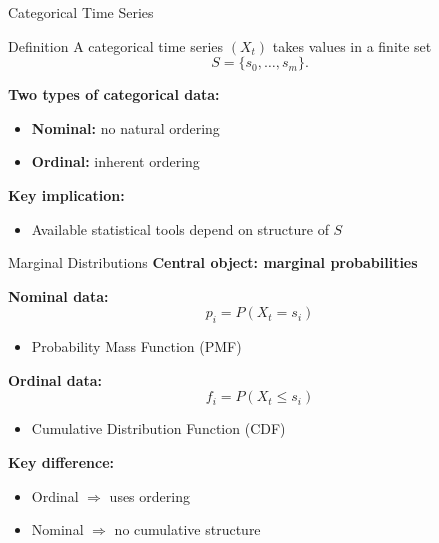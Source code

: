 \documentclass{beamer}
\begin{document}
\begin{frame}{Categorical Time Series}
\begin{block}{Definition}
A categorical time series $(X_t)$ takes values in a finite set
\[
S = \{s_0, \dots, s_m\}.
\]
\end{block}

\vspace{0.3cm}

\textbf{Two types of categorical data:}
\begin{itemize}
    \item \textbf{Nominal:} no natural ordering
    \item \textbf{Ordinal:} inherent ordering
\end{itemize}

\vspace{0.3cm}

\textbf{Key implication:}
\begin{itemize}
    \item Available statistical tools depend on structure of $S$
\end{itemize}
\end{frame}
\begin{frame}{Marginal Distributions}
\textbf{Central object: marginal probabilities}

\vspace{0.3cm}

\textbf{Nominal data:}
\[
p_i = P(X_t = s_i)
\]
\begin{itemize}
    \item Probability Mass Function (PMF)
\end{itemize}

\vspace{0.5cm}

\textbf{Ordinal data:}
\[
f_i = P(X_t \leq s_i)
\]
\begin{itemize}
    \item Cumulative Distribution Function (CDF)
\end{itemize}

\vspace{0.3cm}

\textbf{Key difference:}
\begin{itemize}
    \item Ordinal $\Rightarrow$ uses ordering
    \item Nominal $\Rightarrow$ no cumulative structure
\end{itemize}
\end{frame}
\end{document}
